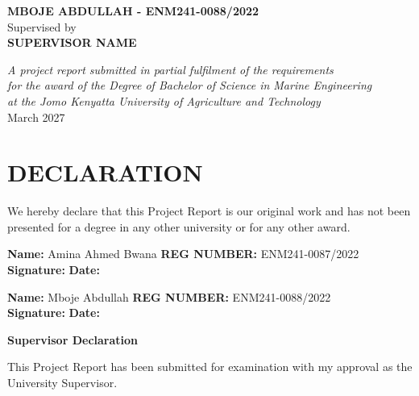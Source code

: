 \documentclass[12pt,a4paper]{report}
\begin{document}
\begin{titlepage}
\begin{center}
{{\large\textbf{MBOJE ABDULLAH - ENM241-0088/2022}}\\[0.05cm]

{\normalsize Supervised by}\\[0.15cm]
{\large\textbf{SUPERVISOR NAME}}

\vfill

{\footnotesize\textit{A project report submitted in partial fulfilment of the requirements}}\\
{\footnotesize\textit{for the award of the Degree of Bachelor of Science in Marine Engineering}}\\
{\footnotesize\textit{at the Jomo Kenyatta University of Agriculture and Technology}}\\[0.2cm]

{\footnotesize March 2027}
}
\end{center}
\end{titlepage}
\hypersetup{pageanchor=true}


\section*{DECLARATION}

We hereby declare that this Project Report is our original work and has not
been presented for a degree in any other university or for any other award.

\vspace{1cm}
\noindent
\textbf{Name:} Amina Ahmed Bwana
\hfill
\textbf{REG NUMBER:} ENM241-0087/2022\\[0.5cm]
\noindent
\textbf{Signature:} \underline{\hspace{5cm}}
\hfill
\textbf{Date:} \underline{\hspace{4cm}}

\vspace{1cm}
\noindent
\textbf{Name:} Mboje Abdullah
\hfill
\textbf{REG NUMBER:} ENM241-0088/2022\\[0.5cm]
\noindent
\textbf{Signature:} \underline{\hspace{5cm}}
\hfill
\textbf{Date:} \underline{\hspace{4cm}}

\vspace{1cm}
\noindent
\textbf{Supervisor Declaration}

\noindent
This Project Report has been submitted for examination with my approval as
the University Supervisor.
\end{document}

